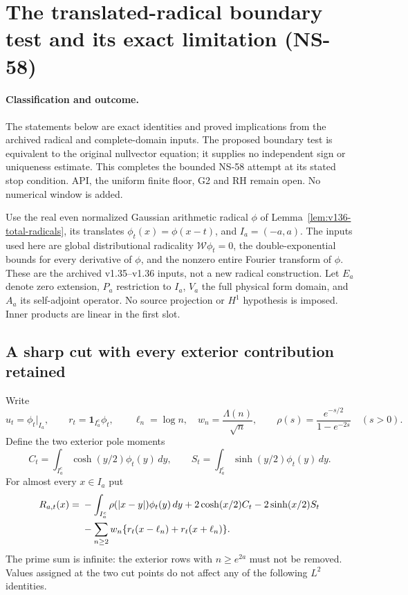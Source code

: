 \section{The translated-radical boundary test and its exact limitation (NS-58)}
\label{sec:ns58-boundary}

\paragraph{Classification and outcome.}
The statements below are exact identities and proved implications from
the archived radical and complete-domain inputs. The proposed boundary
test is equivalent to the original nullvector equation; it supplies no
independent sign or uniqueness estimate. This completes the bounded
NS-58 attempt at its stated stop condition. API, the uniform finite
floor, G2 and RH remain open. No numerical window is added.

Use the real even normalized Gaussian arithmetic radical $\phi$ of
Lemma~\ref{lem:v136-total-radicals}, its translates
$\phi_t(x)=\phi(x-t)$, and $I_a=(-a,a)$. The inputs used here are
global distributional radicality $\mathcal W\phi_t=0$, the
double-exponential bounds for every derivative of $\phi$, and the
nonzero entire Fourier transform of $\phi$. These are the archived
v1.35--v1.36 inputs, not a new radical construction. Let $E_a$ denote
zero extension, $P_a$ restriction to $I_a$, $V_a$ the full physical
form domain, and $A_a$ its self-adjoint operator. No source projection
or $H^1$ hypothesis is imposed. Inner products are linear in the first slot.

\subsection*{A sharp cut with every exterior contribution retained}

Write
\[
 u_t=\phi_t|_{I_a},\qquad r_t=\mathbf1_{I_a^c}\phi_t,
 \qquad \ell_n=\log n,\quad w_n=\frac{\Lambda(n)}{\sqrt n},
 \qquad \rho(s)=\frac{e^{-s/2}}{1-e^{-2s}}\quad(s>0).
\]
Define the two exterior pole moments
\[
 C_t=\int_{I_a^c}\cosh(y/2)\phi_t(y)\,dy,\qquad
 S_t=\int_{I_a^c}\sinh(y/2)\phi_t(y)\,dy.
\]
For almost every $x\in I_a$ put
\begin{align}
 R_{a,t}(x)={}&-\int_{I_a^c}\rho(|x-y|)\phi_t(y)\,dy
       +2\cosh(x/2)C_t-2\sinh(x/2)S_t\notag\\
 &-\sum_{n\ge2}w_n\{r_t(x-\ell_n)+r_t(x+\ell_n)\}.
 \label{eq:ns58-exterior-row}
\end{align}
The prime sum is infinite: the exterior rows with $n\ge e^{2a}$
must not be removed. Values assigned at the two cut points do not
affect any of the following $L^2$ identities.


